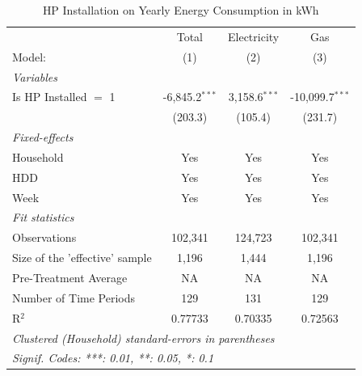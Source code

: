 
\begin{table}[htbp]
   \caption{HP Installation on Yearly Energy Consumption in kWh}
   \centering
   \begin{tabular}{lccc}
      \tabularnewline \midrule \midrule
                                     & Total            & Electricity     & Gas \\   
      Model:                         & (1)              & (2)             & (3)\\  
      \midrule
      \emph{Variables}\\
      Is HP Installed $=$ 1          & -6,845.2$^{***}$ & 3,158.6$^{***}$ & -10,099.7$^{***}$\\   
                                     & (203.3)          & (105.4)         & (231.7)\\   
      \midrule
      \emph{Fixed-effects}\\
      Household                      & Yes              & Yes             & Yes\\  
      HDD                            & Yes              & Yes             & Yes\\  
      Week                           & Yes              & Yes             & Yes\\  
      \midrule
      \emph{Fit statistics}\\
      Observations                   & 102,341          & 124,723         & 102,341\\  
      Size of the 'effective' sample & 1,196            & 1,444           & 1,196\\  
      Pre-Treatment Average          & NA               & NA              & NA\\  
      Number of Time Periods         & 129              & 131             & 129\\  
      R$^2$                          & 0.77733          & 0.70335         & 0.72563\\  
      \midrule \midrule
      \multicolumn{4}{l}{\emph{Clustered (Household) standard-errors in parentheses}}\\
      \multicolumn{4}{l}{\emph{Signif. Codes: ***: 0.01, **: 0.05, *: 0.1}}\\
   \end{tabular}
\end{table}


